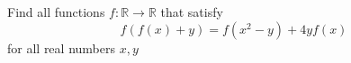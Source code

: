 \documentclass[11pt]{scrartcl}
\begin{document}
\begin{itemize}[label=,itemsep=0.4em,leftmargin=0em]
\begin{comment}
            Since \( f \) is bounded on the interval \( [a, b] \), there exists \( M \in \mathbb{R} \) such that
            \[
            f(x) < M, \forall x \in [a, b].
            \]

            We will prove that the function \( f \) is also bounded on the interval \( [0, b-a] \).
            Indeed, for every \( x \in [0, b-a] \), we have \( x+a \in [a, b] \). Thus,
            \[
            f(x+a) = f(x) + f(a) \ra f(x) = f(x+a) - f(a) \ra -2M < f(x) < 2M.
            \]

            Therefore, \( |f(x)| < 2M \) for all \( x \in [0, b-a] \), implying \( f \) is bounded on the interval \( [0, b-a] \).
            Let \( b-a = d > 0 \). Then \( f \) is bounded on \( [0, d] \). Set \( c = \frac{f(d)}{d} \) and define \( g(x) = f(x) - cx \). For all \( x, y \in \mathbb{R} \), we have
            \[
            g(x+y) = f(x+y) - c(x+y) = f(x) - cx + f(y) - cy = g(x) + g(y).
            \]

            Furthermore, \( g(d) = f(d) - cd = 0 \). Hence, \( g(x+d) = g(x) \) for all \( x \in \mathbb{R} \), meaning \( g \) is periodic. Since \( g \) is also bounded on \( [0, d] \) and periodic over \( \mathbb{R} \), \( g \) must be bounded on \( \mathbb{R} \).
            Assume there exists \( x_0 \) such that \( g(x_0) \neq 0 \). Then for \( n \in \mathbb{N} \), \( g(nx_0) = ng(x_0) \), which implies
            \[
            |g(nx_0)| = n|g(x_0)|, \quad \forall n \in \mathbb{N}.
            \]

            Since \( g(x_0) \neq 0 \), from \( (2) \) we have \( \blim_{n \to \infty} |g(nx_0)| = \blim_{n \to \infty} n|g(x_0)| = +\infty \), contradicting the boundedness assumption. Therefore, \( g(x) = 0 \).
            \end{pro}
            Thus, \( \boxed{f(x) = cx} \).
            Testing again, we find \( c = 1 \). Therefore, the function satisfying the conditions is \( \boxed{f(x) = x} \).

    \end{comment}

   
     \begin{btvn}
        Find all functions $f: \mathbb{R} \to \mathbb{R}$ that satisfy
            $$
            f(f(x)+y)=f\left(x^2-y\right)+4 y f(x)
            $$
            for all real numbers $x, y$
    \end{btvn}
    \begin{comment}
        Let \( P(x,y) \) denote substitution into \( (1) \). \( P\left(x,\frac{x^2 - f(x)}{2}\right) \) yields 
        \[ (x^2 - f(x))f(x) = 0. \]
        Thus, we have \( f(0) = 0 \). It is easy to see that \( f(x) = 0 \) and \( f(x) = x^2 \) are two functions that satisfy this condition. Suppose there exist \( a, b \neq 0 \) such that \( f(a) = 0 \) and \( f(b) = b^2 \).


\end{comment}
\end{itemize}
\end{document}
